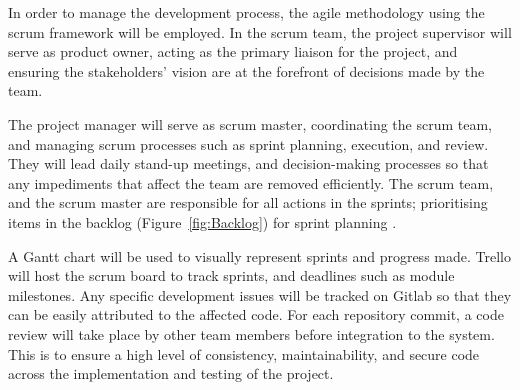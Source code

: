 
{
In order to manage the development process, the agile methodology using the scrum framework will be employed. In the scrum team, the project supervisor will serve as product owner, acting as the primary liaison for the project, and ensuring the stakeholders' vision are at the forefront of decisions made by the team.

The project manager will serve as scrum master, coordinating the scrum team, and managing scrum processes such as sprint planning, execution, and review. They will lead daily stand-up meetings, and decision-making processes so that any impediments that affect the team are removed efficiently. The scrum team, and the scrum master are responsible for all actions in the sprints; prioritising items in the backlog (Figure~\ref{fig:Backlog}) for sprint planning \cite{scrumroles}.

A Gantt chart will be used to visually represent sprints and progress made. Trello will host the scrum board to track sprints, and deadlines such as module milestones. Any specific development issues will be tracked on Gitlab so that they can be easily attributed to the affected code. For each repository commit, a code review will take place by other team members before integration to the system. This is to ensure a high level of consistency, maintainability, and secure code across the implementation and testing of the project. 

}